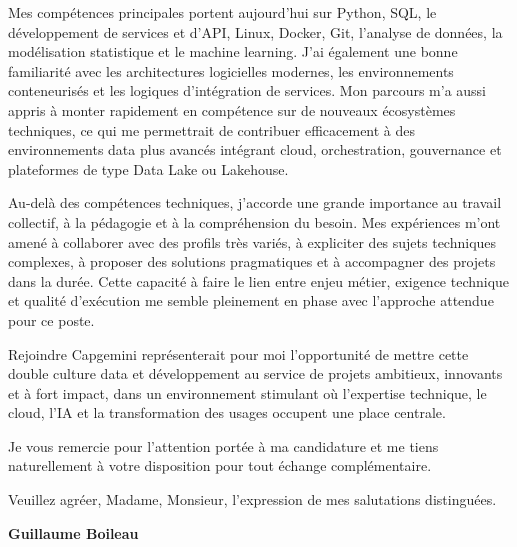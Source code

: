\documentclass[11pt,a4paper]{altacv}
\begin{document}
{Mes compétences principales portent aujourd’hui sur Python, SQL, le développement de services et d’API, Linux, Docker, Git, l’analyse de données, la modélisation statistique et le machine learning. J’ai également une bonne familiarité avec les architectures logicielles modernes, les environnements conteneurisés et les logiques d’intégration de services. Mon parcours m’a aussi appris à monter rapidement en compétence sur de nouveaux écosystèmes techniques, ce qui me permettrait de contribuer efficacement à des environnements data plus avancés intégrant cloud, orchestration, gouvernance et plateformes de type Data Lake ou Lakehouse.

Au-delà des compétences techniques, j’accorde une grande importance au travail collectif, à la pédagogie et à la compréhension du besoin. Mes expériences m’ont amené à collaborer avec des profils très variés, à expliciter des sujets techniques complexes, à proposer des solutions pragmatiques et à accompagner des projets dans la durée. Cette capacité à faire le lien entre enjeu métier, exigence technique et qualité d’exécution me semble pleinement en phase avec l’approche attendue pour ce poste.

Rejoindre Capgemini représenterait pour moi l’opportunité de mettre cette double culture data et développement au service de projets ambitieux, innovants et à fort impact, dans un environnement stimulant où l’expertise technique, le cloud, l’IA et la transformation des usages occupent une place centrale.

Je vous remercie pour l’attention portée à ma candidature et me tiens naturellement à votre disposition pour tout échange complémentaire.

Veuillez agréer, Madame, Monsieur, l’expression de mes salutations distinguées.

\textbf{Guillaume Boileau}

}
\end{document}
